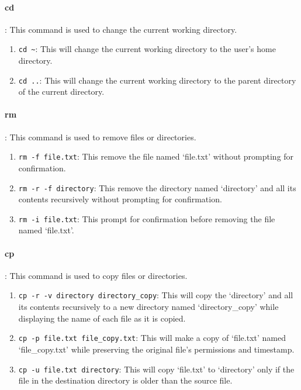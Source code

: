 \documentclass[10pt, a4paper]{article}
\begin{document}
\paragraph{cd}: This command is used to change the current working directory.
\begin{enumerate}
    \item \texttt{cd \textasciitilde}: This will change the current working directory to the user's home directory.
    \item \texttt{cd ..}: This will change the current working directory to the parent directory of the current directory.
\end{enumerate}

\paragraph{rm} : This command is used to remove files or directories.
\begin{enumerate}
    \item \texttt{rm -f file.txt}: This remove the file named `file.txt' without prompting for confirmation.
    \item \texttt{rm -r -f directory}: This remove the directory named `directory' and all its contents recursively without prompting for confirmation.
    \item \texttt{rm -i file.txt}: This prompt for confirmation before removing the file named `file.txt'.
\end{enumerate}

\paragraph{cp}: This command is used to copy files or directories.
\begin{enumerate}
    \item \texttt{cp -r -v directory directory\_copy}: This will copy the `directory' and all its contents recursively to a new directory named `directory\_copy' while displaying the name of each file as it is copied.
    \item \texttt{cp -p file.txt file\_copy.txt}: This will make a copy of `file.txt' named `file\_copy.txt' while preserving the original file's permissions and timestamp.
    \item \texttt{cp -u file.txt directory}: This will copy `file.txt' to `directory' only if the file in the destination directory is older than the source file.
\end{enumerate}
\end{document}
